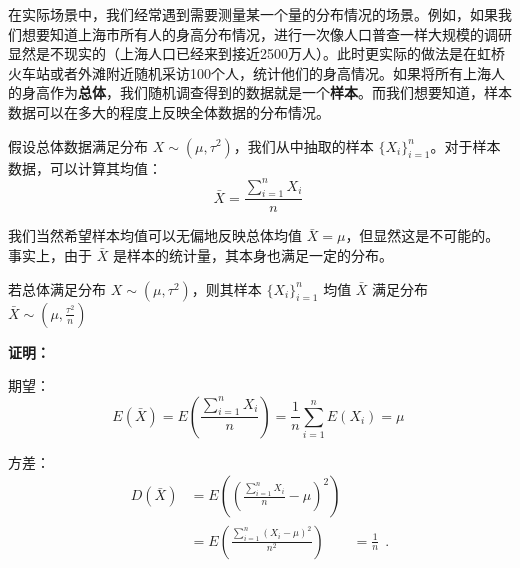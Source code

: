 
在实际场景中，我们经常遇到需要测量某一个量的分布情况的场景。例如，如果我们想要知道上海市所有人的身高分布情况，进行一次像人口普查一样大规模的调研显然是不现实的（上海人口已经来到接近2500万人）。此时更实际的做法是在虹桥火车站或者外滩附近随机采访100个人，统计他们的身高情况。如果将所有上海人的身高作为\textbf{总体}，我们随机调查得到的数据就是一个\textbf{样本}。而我们想要知道，样本数据可以在多大的程度上反映全体数据的分布情况。

假设总体数据满足分布 $X\sim(\mu, \tau^2)$，我们从中抽取的样本 $\{X_i \}_{i=1}^n$。对于样本数据，可以计算其均值：\begin{equation}
\bar X=\frac{\sum_{i=1}^n X_i}{n}~
\end{equation}

我们当然希望样本均值可以无偏地反映总体均值 $\bar X=\mu$，但显然这是不可能的。事实上，由于 $\bar X$ 是样本的统计量，其本身也满足一定的分布。

\begin{theorem}{}
若总体满足分布 $X\sim (\mu, \tau^2)$，则其样本 $\{X_i \}_{i=1}^n$ 均值 $\bar X$ 满足分布 $\bar X\sim (\mu, \frac{\tau^2}{n})$
\end{theorem}
\textbf{证明：}

期望：
\begin{equation}
E(\bar X) =E(\frac{\sum_{i=1}^n X_i}{n}) 
        =\frac 1 n \sum_{i=1}^n E(X_i)=\mu~
\end{equation}

方差：
\begin{equation}
\begin{aligned}
D(\bar X) &=E((\frac{\sum_{i=1}^n X_i}{n}-\mu)^2)\\
&= E(\frac{\sum_{i=1}^n(X_i-\mu)^2}{n^2})
&=\frac 1 n \
~.
\end{aligned}
\end{equation}


